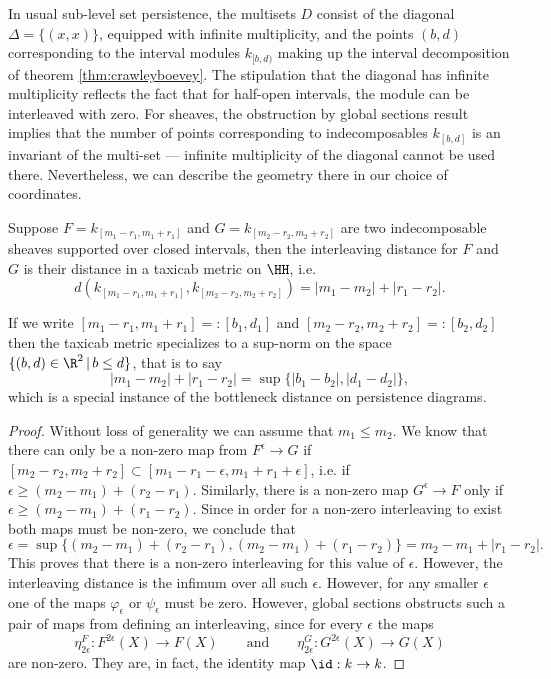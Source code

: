 In usual sub-level set persistence, the multisets $D$ consist of the diagonal $\Delta=\{(x,x)\}$, equipped with infinite multiplicity, and the points $(b,d)$ corresponding to the interval modules $k_{[b,d)}$ making up the interval decomposition of theorem \ref{thm:crawleyboevey}. The stipulation that the diagonal has infinite multiplicity reflects the fact that for half-open intervals, the module can be interleaved with zero. For sheaves, the obstruction by global sections result implies that the number of points corresponding to indecomposables $k_{[b,d]}$ is an invariant of the multi-set --- infinite multiplicity of the diagonal cannot be used there. Nevertheless, we can describe the geometry there in our choice of coordinates.

\begin{lem}
Suppose $F=k_{[m_1-r_1,m_1+r_1]}$ and $G=k_{[m_2-r_2,m_2+r_2]}$ are two indecomposable sheaves supported over closed intervals, then the interleaving distance for $F$ and $G$ is their distance in a taxicab metric on $\HH$, i.e.
\[
d(k_{[m_1-r_1,m_1+r_1]},k_{[m_2-r_2,m_2+r_2]})=|m_1-m_2|+|r_1-r_2|.
\]
\end{lem}
\begin{rmk}
If we write $[m_1-r_1,m_1+r_1]=:[b_1,d_1]$ and $[m_2-r_2,m_2+r_2]=:[b_2,d_2]$ then the taxicab metric specializes to a sup-norm on the space $\{(b,d)\in\R^2\,|\,b\leq d\}$, that is to say
\[
|m_1-m_2|+|r_1-r_2|=\sup\{|b_1-b_2|,|d_1-d_2|\},
\]
which is a special instance of the bottleneck distance on persistence diagrams.
\end{rmk}
\begin{proof}
Without loss of generality we can assume that $m_1\leq m_2$. We know that there can only be a non-zero map from $F^{\epsilon}\to G$ if $[m_2-r_2,m_2+r_2]\subset [m_1-r_1-\epsilon,m_1+r_1+\epsilon]$, i.e. if $\epsilon\geq (m_2-m_1)+(r_2-r_1)$. Similarly, there is a non-zero map $G^{\epsilon}\to F$ only if $\epsilon\geq (m_2-m_1)+(r_1-r_2)$. Since in order for a non-zero interleaving to exist both maps must be non-zero, we conclude that
\[
\epsilon=\sup\{(m_2-m_1)+(r_2-r_1),(m_2-m_1)+(r_1-r_2)\}=m_2-m_1 + |r_1-r_2|.
\]
This proves that there is a non-zero interleaving for this value of $\epsilon$. However, the interleaving distance is the infimum over all such $\epsilon$. However, for any smaller $\epsilon$ one of the maps $\varphi_{\epsilon}$ or $\psi_{\epsilon}$ must be zero. However, global sections obstructs such a pair of maps from defining an interleaving, since for every $\epsilon$ the maps
\[
\eta^F_{2\epsilon}:F^{2\epsilon}(X) \to F(X) \qquad \mathrm{and} \qquad \eta^G_{2\epsilon}:G^{2\epsilon}(X) \to G(X)
\]
are non-zero. They are, in fact, the identity map $\id:k\to k$.
\end{proof}

